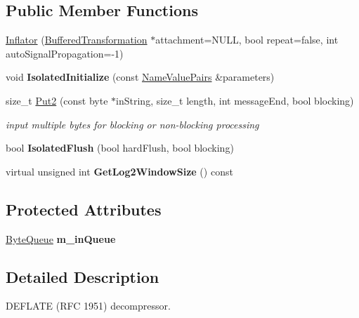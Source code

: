 \subsection*{Public Member Functions}
\begin{DoxyCompactItemize}
\item 
\hyperlink{class_inflator_a525a109323ed6dfb57be3a06e44fb93e}{Inflator} (\hyperlink{class_buffered_transformation}{BufferedTransformation} $\ast$attachment=NULL, bool repeat=false, int autoSignalPropagation=-\/1)
\item 
\hypertarget{class_inflator_a498b0cb5eaf4f73715f2608c7f3c31ab}{
void {\bfseries IsolatedInitialize} (const \hyperlink{class_name_value_pairs}{NameValuePairs} \&parameters)}
\label{class_inflator_a498b0cb5eaf4f73715f2608c7f3c31ab}

\item 
size\_\-t \hyperlink{class_inflator_aeb7d602a16d9263b25b96030aa5583ec}{Put2} (const byte $\ast$inString, size\_\-t length, int messageEnd, bool blocking)
\begin{DoxyCompactList}\small\item\em input multiple bytes for blocking or non-\/blocking processing \item\end{DoxyCompactList}\item 
\hypertarget{class_inflator_affacf5ce529cc11dc72e5b46ef42d9f7}{
bool {\bfseries IsolatedFlush} (bool hardFlush, bool blocking)}
\label{class_inflator_affacf5ce529cc11dc72e5b46ef42d9f7}

\item 
\hypertarget{class_inflator_ac4aea5c2515d6d730fa3f7962adcff79}{
virtual unsigned int {\bfseries GetLog2WindowSize} () const }
\label{class_inflator_ac4aea5c2515d6d730fa3f7962adcff79}

\end{DoxyCompactItemize}
\subsection*{Protected Attributes}
\begin{DoxyCompactItemize}
\item 
\hypertarget{class_inflator_ae219ede9a3c7342d6c9262f87c8a571d}{
\hyperlink{class_byte_queue}{ByteQueue} {\bfseries m\_\-inQueue}}
\label{class_inflator_ae219ede9a3c7342d6c9262f87c8a571d}

\end{DoxyCompactItemize}


\subsection{Detailed Description}
DEFLATE (RFC 1951) decompressor. 

